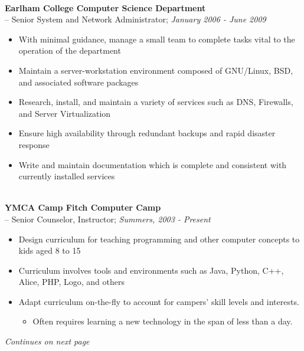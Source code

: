 \documentclass[10pt]{article}
\begin{document}
~\\
\indent\textbf{Earlham College Computer Science Department}~\\
\indent \indent -- Senior System and Network Administrator; \textit{January 2006 - June 2009}
  \begin{itemize}
  \addtolength{\itemsep}{-2mm}
    \item \indent With minimal guidance, manage a small team to complete tasks vital to the operation of the department
    \item \indent Maintain a server-workstation environment composed of GNU/Linux, BSD, and associated software packages
    \item \indent Research, install, and maintain a variety of services such as DNS, Firewalls, and Server Virtualization
    \item \indent Ensure high availability through redundant backups and rapid disaster response
    \item \indent Write and maintain documentation which is complete and consistent with currently installed services
  \end{itemize}
~\\
\indent\textbf{YMCA Camp Fitch Computer Camp}~\\
\indent \indent -- Senior Counselor, Instructor; \textit{Summers, 2003 - Present}
  \begin{itemize}
  \addtolength{\itemsep}{-2mm}
    \item \indent Design curriculum for teaching programming and other computer concepts to kids aged 8 to 15
    \item \indent Curriculum involves tools and environments such as Java, Python, C++, Alice, PHP, Logo, and others
    \item \indent Adapt curriculum on-the-fly to account for campers' skill levels and interests.
		\vspace{-2mm}
		\begin{itemize}
			\addtolength{\itemsep}{-2mm}
			\item Often requires learning a new technology in the span of less than a day.
		\end{itemize}
		\vspace{-2mm}
  \end{itemize}

\vfill

\begin{flushright}
\emph{Continues on next page}
\end{flushright}
\end{document}
